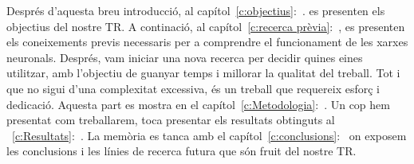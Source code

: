 Després d'aquesta breu introducció, al capítol~\ref{c:objectius}:~. es presenten els objectius del nostre TR. A continació, al capítol~\ref{c:recerca prèvia}:~, es presenten els coneixements previs necessaris per a comprendre el funcionament de les xarxes neuronals.
Després, vam iniciar una nova recerca per decidir quines eines utilitzar, amb l’objectiu de guanyar temps i millorar la qualitat del treball. Tot i que no sigui d’una complexitat excessiva, és un treball que requereix esforç i dedicació. Aquesta part es mostra en el capítol~\ref{c:Metodologia}:~. Un cop hem presentat com treballarem, toca presentar els resultats obtinguts al ~\ref{c:Resultats}:~.
La memòria es tanca amb el capítol~\ref{c:conclusions}:~ on exposem les conclusions i les línies de recerca futura que són fruit del nostre TR.


